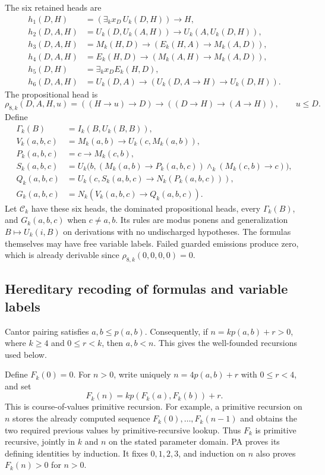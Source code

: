 The six retained heads are
\begin{align*}
 h_1(D,H)&=(\exists_k x_D\,U_k(D,H))\to H,\\
 h_2(D,A,H)&=U_k(D,U_k(A,H))\to U_k(A,U_k(D,H)),\\
 h_3(D,A,H)&=M_k(H,D)\to(E_k(H,A)\to M_k(A,D)),\\
 h_4(D,A,H)&=E_k(H,D)\to(M_k(A,H)\to M_k(A,D)),\\
 h_5(D,H)&=\exists_k x_D E_k(H,D),\\
 h_6(D,A,H)&=U_k(D,A)\to(U_k(D,A\to H)\to U_k(D,H)).
\end{align*}
The propositional head is
\[
 \rho_{8,k}(D,A,H,u)
   =((H\to u)\to D)\to((D\to H)\to(A\to H)),
 \qquad u\leq D.
\]
Define
\begin{align*}
 \Gamma_k(B)&=I_k(B,U_k(B,B)),\\
 V_k(a,b,c)&=M_k(a,b)\to U_k(c,M_k(a,b)),\\
 P_k(a,b,c)&=c\to M_k(c,b),\\
 S_k(a,b,c)&=U_k\bigl(b,
       (M_k(a,b)\to P_k(a,b,c))\wedge_k(M_k(c,b)\to c)\bigr),\\
 Q_k(a,b,c)&=U_k(c,S_k(a,b,c)\to N_k(P_k(a,b,c))),\\
 G_k(a,b,c)&=N_k(V_k(a,b,c)\to Q_k(a,b,c)).
\end{align*}
Let $\mathcal C_k$ have these six heads, the dominated propositional
heads, every $\Gamma_k(B)$, and $G_k(a,b,c)$ when $c\ne a,b$.
Its rules are modus ponens and generalization
$B\mapsto U_k(i,B)$ on derivations with no undischarged hypotheses.
The formulas themselves may have free variable labels. Failed guarded
emissions produce zero, which is already derivable since
$\rho_{8,k}(0,0,0,0)=0$.

\subsection{Hereditary recoding of formulas and variable labels}

Cantor pairing satisfies $a,b\leq p(a,b)$. Consequently, if
$n=kp(a,b)+r>0$, where $k\geq4$ and $0\leq r<k$, then $a,b<n$.
This gives the well-founded recursions used below.

Define $F_k(0)=0$. For $n>0$, write uniquely
$n=4p(a,b)+r$ with $0\leq r<4$, and set
\[
 F_k(n)=kp(F_k(a),F_k(b))+r.                 \tag{R1}
\]
This is course-of-values primitive recursion. For example, a primitive
recursion on $n$ stores the already computed sequence
$F_k(0),\ldots,F_k(n-1)$ and obtains the two required previous values
by primitive-recursive lookup. Thus $F_k$ is primitive recursive,
jointly in $k$ and $n$ on the stated parameter domain. PA proves its
defining identities by induction. It fixes $0,1,2,3$, and induction
on $n$ also proves $F_k(n)>0$ for $n>0$.

